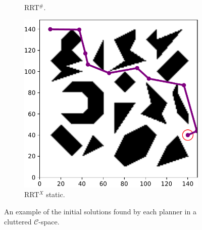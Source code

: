 \documentclass{ctuthesis}
\begin{document}
\begin{figure}[!ht]
\begin{subfigure}[t]{0.264\textwidth}
    \caption{RRT$^\#$.}
  \end{subfigure}  
  \begin{subfigure}[t]{0.264\textwidth}
    \includegraphics[width=\textwidth]{figChap5/Maze_clutter_first_solution_RRTXstatic.pdf}  
    \caption{RRT$^X$ static.}
  \end{subfigure}   
  \caption{An example of the initial solutions found by each planner 
  in a cluttered $\mathcal{C}$-space.}
  \label{fig:first_sol_clutter}
\end{figure}
\end{document}
